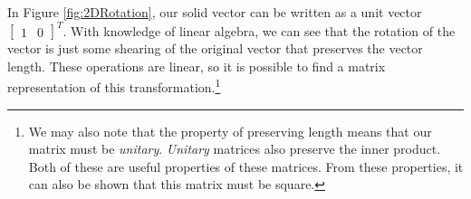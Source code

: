 \documentclass[12pt]{report}
\begin{document}
In Figure \ref{fig:2DRotation}, our solid vector can be written as a unit vector $\begin{bmatrix}
    1&0
\end{bmatrix}^T$.
With knowledge of linear algebra, we can see that the rotation of the vector is just some shearing of the original vector that preserves the vector length. These operations are \gls{linear}, so it is possible to find a matrix representation of this transformation.\footnote{We may also note that the property of preserving length means that our matrix must be \textit{unitary}. \textit{Unitary} matrices also preserve the inner product. Both of these are useful properties of these matrices. From these properties, it can also be shown that this matrix must be square.}
\end{document}
